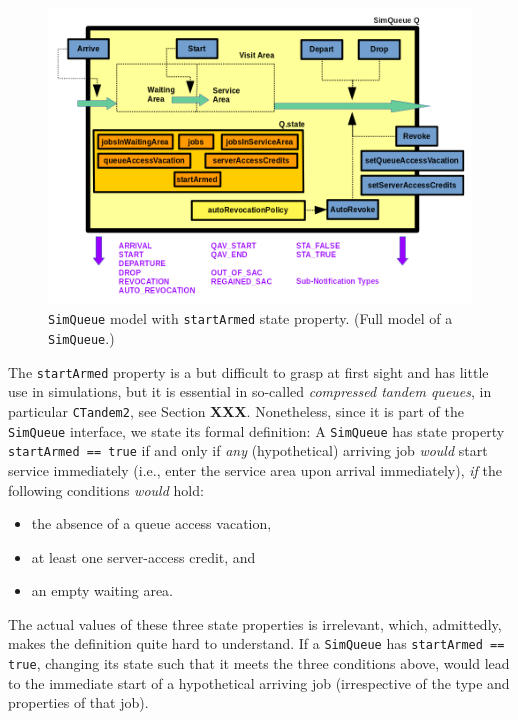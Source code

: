 \begin{figure}[!htbp]
\label{fig:StartArmed}
\caption{\texttt{SimQueue} model with \texttt{startArmed} state property.
         (Full model of a \texttt{SimQueue}.)}
\includegraphics[width=\textwidth]{fig/StartArmed}
\end{figure}

\begin{sloppypar}
The \lstinline|startArmed|
  property is a but difficult to grasp at first sight
  and has little use in simulations,
  but it is essential in so-called {\em compressed tandem queues},
  in particular \lstinline|CTandem2|,
  see Section {\bf XXX}.
Nonetheless,
  since it is part of the \lstinline-SimQueue- interface,
  we state its formal definition:
A \lstinline-SimQueue- has state
  property \lstinline-startArmed == true-
  if and only if {\em any\/} (hypothetical)
  arriving job
  {\em would\/} start service immediately
  (i.e., enter the service area upon arrival immediately),
  {\em if\/} the following conditions {\em would\/} hold:
\begin{itemize}
\item the absence of a queue access vacation,
\item at least one server-access credit, and
\item an empty waiting area. 
\end{itemize}
The actual values of these three state properties is irrelevant,
  which, admittedly, makes the definition quite hard to understand.
If a \lstinline-SimQueue- has \lstinline-startArmed == true-,
  changing its state such that it meets the three conditions above,
  would lead to the immediate start of a hypothetical arriving job
  (irrespective of the type and properties of that job).
\end{sloppypar}

